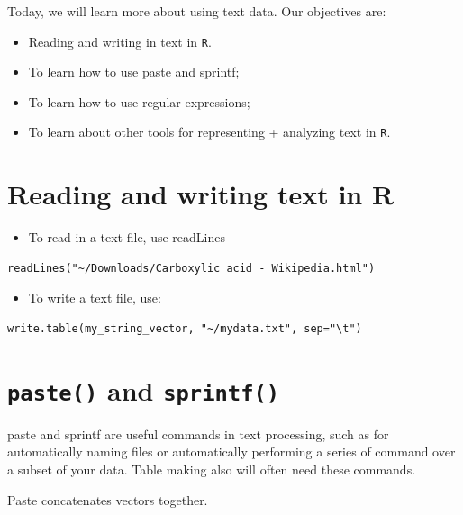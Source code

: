\documentclass[]{book}
\newenvironment{Shaded}{\begin{snugshade}}{\end{snugshade}}
\providecommand{\tightlist}{%
  \setlength{\itemsep}{0pt}\setlength{\parskip}{0pt}}
\theoremstyle{definition}
\theoremstyle{definition}
\theoremstyle{definition}
\theoremstyle{remark}
\begin{document}
\begin{Shaded}
\begin{Highlighting}[]
\begin{Shaded}
\begin{Highlighting}[]
\begin{Shaded}
\begin{Highlighting}[]
Today, we will learn more about using text data. Our objectives are:

\begin{itemize}
\tightlist
\item
  Reading and writing in text in \texttt{R}.
\item
  To learn how to use paste and sprintf;
\item
  To learn how to use regular expressions;
\item
  To learn about other tools for representing + analyzing text in \texttt{R}.
\end{itemize}

\hypertarget{reading-and-writing-text-in-r}{%
\section{Reading and writing text in R}\label{reading-and-writing-text-in-r}}

\begin{itemize}
\tightlist
\item
  To read in a text file, use readLines
\end{itemize}

\begin{verbatim}
readLines("~/Downloads/Carboxylic acid - Wikipedia.html")
\end{verbatim}

\begin{itemize}
\tightlist
\item
  To write a text file, use:
\end{itemize}

\begin{verbatim}
write.table(my_string_vector, "~/mydata.txt", sep="\t") 
\end{verbatim}

\hypertarget{paste-and-sprintf}{%
\section{\texorpdfstring{\texttt{paste()} and \texttt{sprintf()}}{paste() and sprintf()}}\label{paste-and-sprintf}}

paste and sprintf are useful commands in text processing, such as for automatically naming files or automatically performing a series of command over a subset of your data. Table making also will often need these commands.

Paste concatenates vectors together.


\end{Highlighting}
\end{Shaded}
\end{Highlighting}
\end{Shaded}
\end{Highlighting}
\end{Shaded}
\end{document}
